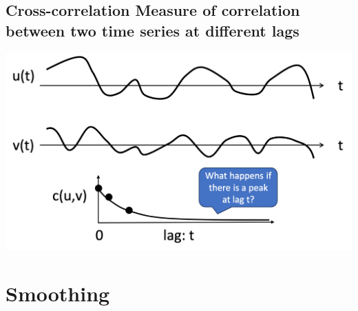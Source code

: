 \documentclass[11pt]{article}
\theoremstyle{definition}
\begin{document}
\subsection{Cross-correlation
Measure of correlation between two time series
at different lags}
\includegraphics[width=\textwidth/2]{13.png}

\section{Smoothing}
\end{document}
